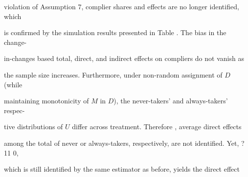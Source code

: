 \documentclass[a4paper,12pt]{article}
\begin{document}
violation of Assumption 7, complier shares and effects are no longer identified, which

is confirmed by the simulation results presented in Table . The bias in the change-

in-changes based total, direct, and indirect effects on compliers do not vanish as

the sample size increases. Furthermore, under non-random assignment of $D$ (while

maintaining monotonicity of $M$ in $D$), the never-takers’ and always-takers’ respec-

tive distributions of $U$ differ across treatment. Therefore , average direct effects

among the total of never or always-takers, respectively, are not identified. Yet, ?11 0,

which is still identified by the same estimator as before, yields the direct effect
\end{document}
